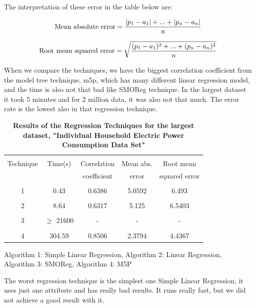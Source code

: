 \documentclass[a4paper]{article}
\begin{document}
The interpretation of these error in the table below are:

\begin{equation*}
    \textnormal{Mean absolute error} = \frac{|p_1 - a_1| + ... + |p_n - a_n|}{n}
\end{equation*}

\begin{equation*}
    \textnormal{Root mean squared error} =\sqrt{ \frac{(p_1 - a_1)^2 + ... + (p_n - a_n)^2}{n} }
\end{equation*}

When we compare the techniques, we have the biggest correlation coefficient from the model tree technique, m5p, which has many different linear regression model, and the time is also not that bad like SMOReg technique. In the largest dataset it took 5 minutes and for 2 million data, it was also not that much. The error rate is the lowest also in that regression technique. 

\begin{table}[b]
\begin{tabular}{| c | c | c |c |c |}
\hline & & & & \\
Technique & Time(s) & Correlation & Mean abs.  & Root mean \\
 & & coefficient & error & squared error  \\
\hline & & & &  \\
1  & 0.43  & 0.6386  & 5.0592  & 6.493  \\ 
\hline & & & & \\
2  & 8.64  & 0.6317  & 5.125  &  6.5403 \\ 
\hline & & & & \\
3  & $\ge$ 21600  & - & - & - \\ 
\hline & & & & \\
4  &  304.59 &  0.8506 & 2.3794 & 4.4367 \\ 
\hline
\end{tabular}
\caption{\textbf{Results of the Regression Techniques for the largest dataset, "Individual Household Electric Power Consumption Data Set" }}
    Algorithm 1: Simple Linear Regression,
    Algorithm 2: Linear Regression,
    Algorithm 3: SMOReg,
    Algorithm 4: M5P
\end{table}

The worst regression technique is the simplest one Simple Linear Regression, it uses just one attribute and has really bad results. It runs really fast, but we did not achieve a good result with it.
\end{document}
